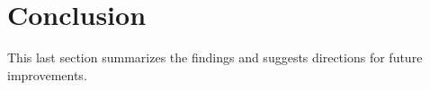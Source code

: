\documentclass{article}
\begin{document}
\section{Conclusion}
\label{sec:conc}
    This last section summarizes the findings and suggests directions for future improvements.

\vfill\pagebreak



\end{document}
